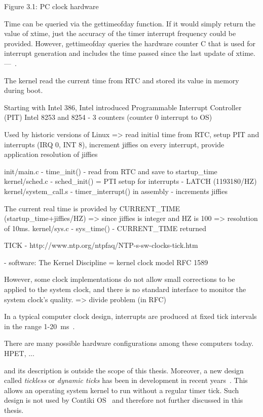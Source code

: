 Figure 3.1: PC clock hardware

Time can be queried via the gettimeofday function.
If it would simply return the value of xtime,
just the accuracy of the timer interrupt frequency could be provided.
However, gettimeofday queries the hardware counter C that is used for
interrupt generation and includes the time passed since the last update of xtime.
---~\cite{thesis-beat}.

The kernel read the current time from RTC and stored its value in memory during boot.

Starting with Intel 386, Intel introduced
Programmable Interrupt Controller (PIT) Intel 8253 and 8254 - 3 counters (counter 0 interrupt to OS)

Used by historic versions of Linux
=> read initial time from RTC, setup PIT and interrupts (IRQ 0, INT 8), increment jiffies on every interrupt, provide application resolution of jiffies

init/main.c - time\_init() - read from RTC and save to startup\_time
kernel/sched.c - sched\_init() = PTI setup for interrupts - LATCH (1193180/HZ)
kernel/system\_call.s - timer\_interrupt() in assembly - increments jiffies

The current real time is provided by CURRENT\_TIME (startup\_time+jiffies/HZ) => since jiffies is integer and HZ is 100 => resolution of 10ms.
kernel/sys.c - sys\_time() - CURRENT\_TIME returned

TICK - http://www.ntp.org/ntpfaq/NTP-s-sw-clocks-tick.htm


- software:
The Kernel Discipline =  kernel clock model RFC 1589

However, some clock implementations do not allow small corrections to be applied to the system clock, and there is no standard interface to monitor the system clock's quality.
=> divide problem (in RFC)


In a typical computer clock design, interrupts are produced at
fixed tick intervals in the range 1-20~ms~\cite{nanokernel}.

There are many possible hardware configurations among these computers today.
HPET, ... %

and its description is outside the scope of this thesis.
Moreover, a new design called {\it{tickless}} or {\it{dynamic ticks}}
has been in development in recent years~\cite{kernel-timer-systems}.
This allows an operating system kernel to run without a regular timer tick.
Such design is not used by Contiki OS~\cite{contiki-docs} and
therefore not further discussed in this thesis.

